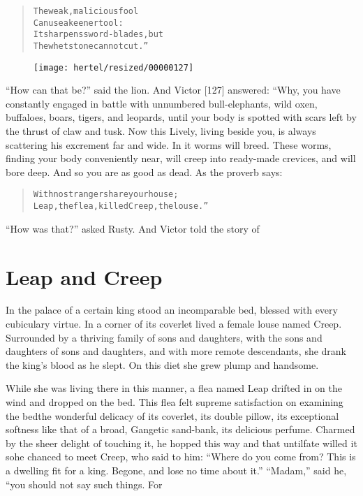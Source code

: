 \documentclass[article, twoside, 10pt]{memoir}
\renewenvironment{verbatim}{%
\begin{quote}%
\vskip -10pt%
\begin{alltt}\normalfont\small}{\end{alltt}%
\end{quote}%
\vskip -10pt
} %
\begin{document}
\begin{verbatim}
The weak, malicious fool
Can use a keener tool:
It sharpens sword-blades, but
The whetstone cannot cut.”
\end{verbatim}
\begin{figure}[p]\texttt{[image: hertel/resized/00000127]}\end{figure}``How can that be?'' said the lion. And Victor [127] answered:
“Why, you have constantly engaged in battle with unnumbered
bull-elephants, wild oxen, buffaloes, boars, tigers, and leopards,
until your body is spotted with scars left by the thrust of claw
and tusk. Now this Lively, living beside you, is always scattering
his excrement far and wide. In it worms will breed. These worms,
finding your body conveniently near, will creep into ready-made
crevices, and will bore deep. And so you are as good as dead. As
the proverb says:

\begin{verbatim}
With no stranger share your house;
Leap, the flea, killed Creep, the louse.”
\end{verbatim}
``How was that?'' asked Rusty. And Victor told the story of

\chapter{Leap and Creep}

In the palace of a certain king stood an incomparable bed, blessed
with every cubiculary virtue. In a corner of its coverlet lived a
female louse named Creep. Surrounded by a thriving family of sons
and daughters, with the sons and daughters of sons and daughters,
and with more remote descendants, she drank the king's blood as he
slept. On this diet she grew plump and handsome.

While she was living there in this manner, a flea named Leap
drifted in on the wind and dropped on the bed. This flea felt
supreme satisfaction on examining the bed{\textemdash}the wonderful delicacy
of its coverlet, its double pillow, its exceptional softness like
that of a broad, Gangetic sand-bank, its delicious perfume. Charmed
by the sheer delight of touching it, he hopped this way and that
until{\textemdash}fate willed it so{\textemdash}he chanced to meet Creep, who said to
him:
``Where do you come from? This is a dwelling fit for a king. Begone, and lose no time about it.''
``Madam,'' said he, “you should not say such things. For
\end{document}
